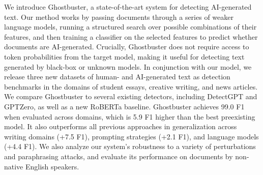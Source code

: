 We introduce Ghostbuster, a state-of-the-art system for detecting AI-generated text. Our method works by passing documents through a series of weaker language models, running a structured search over possible combinations of their features, and then training a classifier on the selected features to predict whether documents are AI-generated. Crucially, Ghostbuster does not require access to token probabilities from the target model, making it useful for detecting text generated by black-box or unknown models. In conjunction with our model, we release three new datasets of human- and AI-generated text as detection benchmarks in the domains of student essays, creative writing, and news articles. We compare Ghostbuster to several existing detectors, including DetectGPT and GPTZero, as well as a new RoBERTa baseline. Ghostbuster achieves 99.0 F1 when evaluated across domains, which is 5.9 F1 higher than the best preexisting model. It also outperforms all previous approaches in generalization across writing domains (+7.5 F1), prompting strategies (+2.1 F1), and language models (+4.4 F1). We also analyze our system's robustness to a variety of perturbations and paraphrasing attacks, and evaluate its performance on documents by non-native English speakers.
